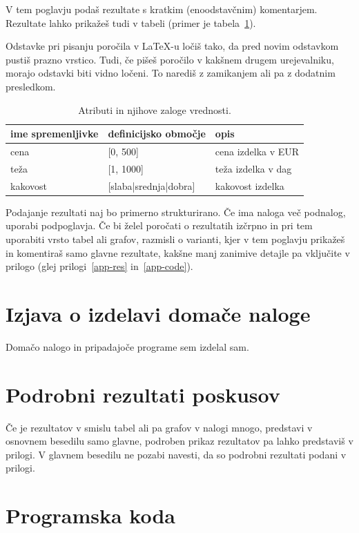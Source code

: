 \documentclass[a4paper,11pt]{article}
\begin{document}
V tem poglavju podaš rezultate s kratkim (enoodstavčnim)
komentarjem. Rezultate lahko prikažeš tudi v tabeli (primer je
tabela~\ref{tab1}).

Odstavke pri pisanju poročila v LaTeX-u ločiš tako, da pred novim
odstavkom pustiš prazno vrstico. Tudi, če pišeš poročilo v kakšnem
drugem urejevalniku, morajo odstavki biti vidno ločeni. To narediš z
zamikanjem ali pa z dodatnim presledkom.

\begin{table}[htbp]
\caption{Atributi in njihove zaloge vrednosti.}
\label{tab1}
\begin{center}
\begin{tabular}{llp{3cm}}
\hline
ime spremenljivke & definicijsko območje & opis \\
\hline
cena & [0, 500] & cena izdelka v EUR\\
teža & [1, 1000] & teža izdelka v dag \\
kakovost & [slaba|srednja|dobra] & kakovost izdelka \\
\hline
\end{tabular}
\end{center}
\end{table}

Podajanje rezultati naj bo primerno strukturirano. Če ima naloga več
podnalog, uporabi podpoglavja. Če bi želel poročati o rezultatih
izčrpno in pri tem uporabiti vrsto tabel ali grafov, razmisli o
varianti, kjer v tem poglavju prikažeš in komentiraš samo glavne
rezultate, kakšne manj zanimive detajle pa vključite v prilogo (glej
prilogi~\ref{app-res} in~\ref{app-code}).

\section{Izjava o izdelavi domače naloge}
Domačo nalogo in pripadajoče programe sem izdelal sam.

\appendix
\appendixpage
\section{\label{app-res}Podrobni rezultati poskusov}

Če je rezultatov v smislu tabel ali pa grafov v nalogi mnogo,
predstavi v osnovnem besedilu samo glavne, podroben prikaz
rezultatov pa lahko predstaviš v prilogi. V glavnem besedilu ne
pozabi navesti, da so podrobni rezultati podani v prilogi.

\section{\label{app-code}Programska koda}
\end{document}
